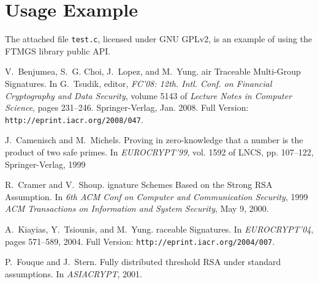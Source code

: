 \documentclass[a4paper]{article}
\begin{document}
\section{Usage Example}
The attached file \verb|test.c|, licensed under GNU GPLv2, is an
example of using the FTMGS library public API.
\begin{thebibliography}{10}

V.~Benjumea, S.~G. Choi, J.~Lopez, and M.~Yung.
air {T}raceable {M}ulti-{G}roup {S}ignatures.
\newblock In G.~Tsudik, editor, {\em {FC}'08: 12th. Intl. Conf. on Financial
  Cryptography and Data Security}, volume 5143 of {\em Lecture Notes in
  Computer Science}, pages 231--246. Springer-Verlag, Jan. 2008.
  Full Version: \texttt{http://eprint.iacr.org/2008/047}.

J.~Camenisch and M.~Michels.
\newblock  Proving in zero-knowledge that a number is the product of
    two safe primes. 
\newblock In {\em EUROCRYPT'99}, vol. 1592 of {LNCS}, pp. 107--122,
    Springer-Verlag, 1999 

R.~Cramer and V.~Shoup.
ignature {S}chemes {B}ased on the {S}trong {RSA} {A}ssumption.
\newblock In {\em 6th ACM Conf on Computer and Communication Security}, 1999
  {\em ACM Transactions on Information and System Security}, May 9, 2000.

A.~Kiayias, Y.~Tsiounis, and M.~Yung.
raceable {S}ignatures.
\newblock In {\em EUROCRYPT'04}, pages 571--589, 2004.
\newblock Full Version: \texttt{http://eprint.iacr.org/2004/007}.

P.~Fouque and J.~Stern.
\newblock Fully distributed threshold {RSA} under standard assumptions.
\newblock In {\em ASIACRYPT}, 2001.

\end{thebibliography}
\end{document}
